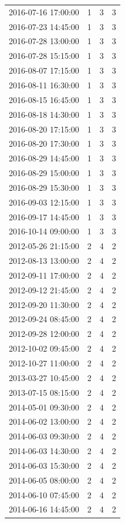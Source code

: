 \begin{tabular}{lrrr}
2016-07-16 17:00:00 & 1 & 3 & 3 \\
2016-07-23 14:45:00 & 1 & 3 & 3 \\
2016-07-28 13:00:00 & 1 & 3 & 3 \\
2016-07-28 15:15:00 & 1 & 3 & 3 \\
2016-08-07 17:15:00 & 1 & 3 & 3 \\
2016-08-11 16:30:00 & 1 & 3 & 3 \\
2016-08-15 16:45:00 & 1 & 3 & 3 \\
2016-08-18 14:30:00 & 1 & 3 & 3 \\
2016-08-20 17:15:00 & 1 & 3 & 3 \\
2016-08-20 17:30:00 & 1 & 3 & 3 \\
2016-08-29 14:45:00 & 1 & 3 & 3 \\
2016-08-29 15:00:00 & 1 & 3 & 3 \\
2016-08-29 15:30:00 & 1 & 3 & 3 \\
2016-09-03 12:15:00 & 1 & 3 & 3 \\
2016-09-17 14:45:00 & 1 & 3 & 3 \\
2016-10-14 09:00:00 & 1 & 3 & 3 \\
2012-05-26 21:15:00 & 2 & 4 & 2 \\
2012-08-13 13:00:00 & 2 & 4 & 2 \\
2012-09-11 17:00:00 & 2 & 4 & 2 \\
2012-09-12 21:45:00 & 2 & 4 & 2 \\
2012-09-20 11:30:00 & 2 & 4 & 2 \\
2012-09-24 08:45:00 & 2 & 4 & 2 \\
2012-09-28 12:00:00 & 2 & 4 & 2 \\
2012-10-02 09:45:00 & 2 & 4 & 2 \\
2012-10-27 11:00:00 & 2 & 4 & 2 \\
2013-03-27 10:45:00 & 2 & 4 & 2 \\
2013-07-15 08:15:00 & 2 & 4 & 2 \\
2014-05-01 09:30:00 & 2 & 4 & 2 \\
2014-06-02 13:00:00 & 2 & 4 & 2 \\
2014-06-03 09:30:00 & 2 & 4 & 2 \\
2014-06-03 14:30:00 & 2 & 4 & 2 \\
2014-06-03 15:30:00 & 2 & 4 & 2 \\
2014-06-05 08:00:00 & 2 & 4 & 2 \\
2014-06-10 07:45:00 & 2 & 4 & 2 \\
2014-06-16 14:45:00 & 2 & 4 & 2 \\

\end{tabular}
